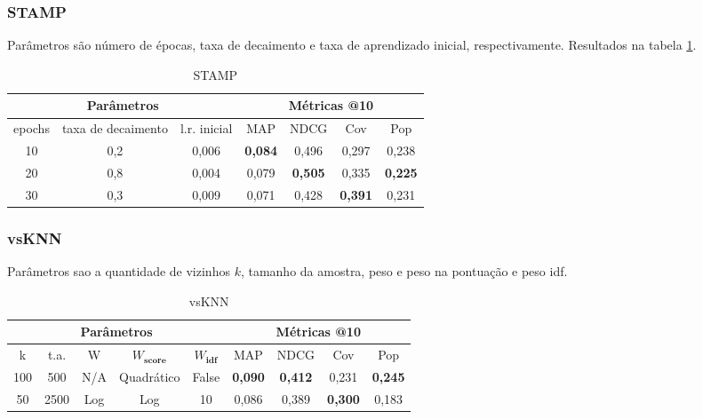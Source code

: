 \subsubsection{STAMP}
Parâmetros são número de épocas, taxa de decaimento e taxa de aprendizado inicial, respectivamente.
Resultados na tabela \ref{opt:stamp_rem}.

\begin{table}[htbp]
  \centering
  \begin{tabular}{|c|c|c|c|c|c|c|}
    \hline
      \multicolumn{3}{|c|}{Parâmetros} & \multicolumn{4}{c|}{Métricas @10} \\
      \hline
      epochs & taxa de decaimento & l.r. inicial & MAP & NDCG & Cov & Pop \\
      \hline
      10 & 0,2 & 0,006 & \textbf{0,084} & 0,496 & 0,297 & 0,238 \\
      \hline
      20 & 0,8 & 0,004 & 0,079 & \textbf{0,505} & 0,335 & \textbf{0,225} \\
      \hline
      30 & 0,3 & 0,009 & 0,071 & 0,428 & \textbf{0,391} & 0,231 \\
      \hline
\end{tabular}
      \caption{STAMP}
      \label{opt:stamp_rem}
\end{table}

\subsubsection{vsKNN}
Parâmetros sao a quantidade de vizinhos $k$, tamanho da amostra, peso e peso na
pontuação e peso idf.


\begin{table}[htbp]
  \centering
  \begin{tabular}{|c|c|c|c|c|c|c|c|c|}
    \hline
      \multicolumn{5}{|c|}{Parâmetros} & \multicolumn{4}{c|}{Métricas @10} \\
      \hline
      k & t.a. & W & $W_{\textbf{score}}$ & $W_{\textbf{idf}}$ & MAP & NDCG & Cov & Pop \\
      \hline
      100 & 500 & N/A & Quadrático & False & \textbf{0,090} & \textbf{0,412} & 0,231 & \textbf{0,245} \\
      \hline
      50 & 2500 & Log & Log & 10 & 0,086 & 0,389 & \textbf{0,300} & 0,183 \\
      \hline
\end{tabular}
      \caption{vsKNN}
      \label{opt:vsknn_rem}
\end{table}

